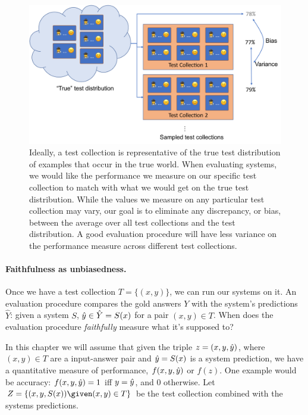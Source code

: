 \begin{figure}
  \centering
  \includegraphics[width=\textwidth]{figures/bias}
  \caption[Bias and variance when evaluating with test collections]{\label{fig:setup:bias} Ideally, a test collection is representative of the true test distribution of examples that occur in the true world.
  When evaluating systems, we would like the performance we measure on our specific test collection to match with what we would get on the true test distribution.
  While the values we measure on any particular test collection may vary, our goal is to eliminate any discrepancy, or bias, between the average over all test collections and the test distribution.
  A good evaluation procedure will have less variance on the performance measure across different test collections.
  }
\end{figure}

\paragraph{Faithfulness as unbiasedness.}
Once we have a test collection $T = \{(x, y)\}$, we can run our systems on it.
An evaluation procedure compares the gold answers $Y$ with the system's predictions $\hat{Y}$:
  given a system $S$, $\hat{y} \in \hat{Y} = S(x)$ for a pair $(x, y) \in T$.
When does the evaluation procedure \textit{faithfully} measure what it's supposed to?

In this chapter we will assume that given the triple $z = (x, y, \hat{y})$, where $(x, y) \in T$ are a input-answer pair and $\hat{y} = S(x)$ is a system prediction, we have a quantitative measure of performance, $f(x, y, \hat{y})$ or $f(z)$.
One example would be accuracy: $f(x, y, \hat{y}) = 1$ iff $y = \hat{y}$, and $0$ otherwise.
Let $Z = \{(x, y, S(x)) \given (x, y) \in T\}$ be the test collection combined with the systems predictions.

